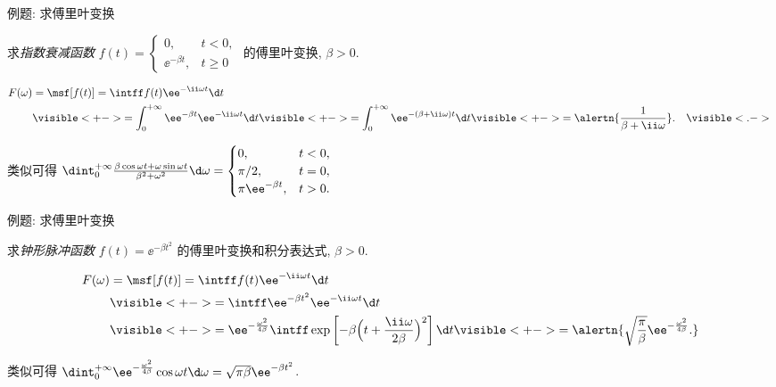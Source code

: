\begin{frame}{例题: 求傅里叶变换}
	\onslide<+->
	\begin{example}[nearnext]
		求\emph{指数衰减函数} $f(t)=
			\begin{cases}
				0,&t<0,\\
				\ee^{-\beta t},&t\ge 0
			\end{cases}$ 的傅里叶变换, $\beta>0$.
	\end{example}
	\onslide<+->
	\begin{solution}[nearprev]
		\bigdel
		\begin{align*}
			F(\omega)&=\msf[f(t)]=\intff f(t)\ee^{-\ii \omega t}\d t\\
			&\visible<+->{=\int_0^{+\infty}\ee^{-\beta t}\ee^{-\ii \omega t}\d t}
			\visible<+->{=\int_0^{+\infty}\ee^{-(\beta+\ii \omega)t}\d t}
			\visible<+->{=\alertn{\frac1{\beta+\ii \omega}}.}&\visible<.->{}
		\end{align*}
	\end{solution}

	\onslide<+->
	类似可得
	$\dint_0^{+\infty}\frac{\beta\cos\omega t+\omega\sin\omega t}{\beta^2+\omega^2}\d\omega=
		\begin{cases}
			0,&t<0,\\
			\pi/2,&t=0,\\
			\pi \ee^{-\beta t},&t>0.
		\end{cases}$
\end{frame}


\begin{frame}{例题: 求傅里叶变换}
	\onslide<+->
	\begin{example}[nearnext]
		求\emph{钟形脉冲函数} $f(t)=\ee^{-\beta t^2}$ 的傅里叶变换和积分表达式, $\beta>0$.
	\end{example}
	\onslide<+->
	\begin{solution}[nearprev]
		\bigdel
		\begin{align*}
			F(\omega)&=\msf[f(t)]=\intff f(t)\ee^{-\ii \omega t}\d t\\
			&\visible<+->{=\intff \ee^{-\beta t^2}\ee^{-\ii \omega t}\d t}\\
			&\visible<+->{=\ee^{-\frac{\omega^2}{4\beta}}\intff \exp\left[-\beta\Bigl(t+\frac{\ii \omega}{2\beta}\Bigr)^2\right]\d t}
			\visible<+->{=\alertn{\sqrt{\frac\pi\beta}\ee^{-\frac{\omega^2}{4\beta}}.}}
		\end{align*}
	\end{solution}

	\onslide<+->
	类似可得
	$\dint_0^{+\infty}\ee^{-\frac{\omega^2}{4\beta}}\cos\omega t\d\omega=\sqrt{\pi\beta}\ee^{-\beta t^2}$.
\end{frame}


